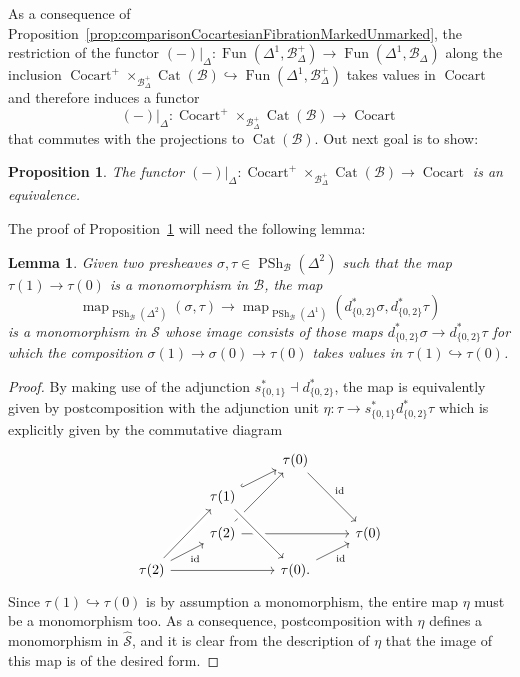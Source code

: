 \documentclass[reqno]{amsart}
\numberwithin{equation}{subsection}
\theoremstyle{plain}
\newtheorem{proposition}[equation]{Proposition}
\newtheorem{lemma}[equation]{Lemma}
\theoremstyle{definition}
\let\scr=\mathcal
\let\into=\hookrightarrow
\def\BB{\scr B}
\def\SS{\scr S}
\def\SSS{\widehat{\SS}}
\DeclareMathOperator{\id}{id}
\DeclareMathOperator{\PSh}{PSh}
\DeclareMathOperator{\Cat}{Cat}
\DeclareMathOperator{\Cocart}{Cocart}
\DeclareMathOperator{\Fun}{Fun}
\DeclareMathOperator{\Map}{map}
\newcommand{\map}[1]{\Map_{#1}}
\newcommand{\Simp}[1]{#1_{\Delta}}
\newcommand{\mSimp}[1]{#1_{\Delta}^+}
\begin{document}
As a consequence of Proposition~\ref{prop:comparisonCocartesianFibrationMarkedUnmarked}, the restriction of the functor $(-)\vert_{\Delta}\colon \Fun(\Delta^1,\mSimp\BB)\to\Fun(\Delta^1,\Simp\BB)$ along the inclusion $\Cocart^+\times_{\mSimp\BB}\Cat(\BB)\into\Fun(\Delta^1,\mSimp\BB)$ takes values in $\Cocart$ and therefore induces a functor
\begin{equation*}
(-)\vert_{\Delta}\colon \Cocart^+\times_{\mSimp\BB}\Cat(\BB)\to\Cocart
\end{equation*}
that commutes with the projections to $\Cat(\BB)$. Out next goal is to show:

\begin{proposition}
	\label{prop:cocartesianFibrationsMarkedUnmarkedEquivalence}
	The functor $(-)\vert_{\Delta}\colon \Cocart^+\times_{\mSimp\BB}\Cat(\BB)\to\Cocart$ is an equivalence.
\end{proposition}
The proof of Proposition~\ref{prop:cocartesianFibrationsMarkedUnmarkedEquivalence} will need the following lemma:
\begin{lemma}
	\label{lem:restrictionSimplicesMonomorphism}
	Given two presheaves $\sigma,\tau\in\PSh_{\BB}(\Delta^2)$ such that the map $\tau(1)\to\tau(0)$ is a monomorphism in $\BB$, the map
	\begin{equation*}
	\map{\PSh_{\BB}(\Delta^2)}(\sigma,\tau)\to\map{\PSh_{\BB}(\Delta^1)}(d_{\{0,2\}}^\ast\sigma, d_{\{0,2\}}^\ast\tau)
	\end{equation*}
	is a monomorphism in $\SS$ whose image consists of those maps $d_{\{0,2\}}^\ast\sigma\to d_{\{0,2\}}^\ast\tau$ for which the composition $\sigma(1)\to\sigma(0)\to\tau(0)$ takes values in $\tau(1)\into\tau(0)$.
\end{lemma}
\begin{proof}
	By making use of the adjunction $s_{\{0,1\}}^\ast\dashv d_{\{0,2\}}^\ast$, the map is equivalently given by postcomposition with the adjunction unit $\eta\colon \tau\to s_{\{0,1\}}^\ast d_{\{0,2\}}^\ast\tau$ which is explicitly given by the commutative diagram
	\begin{equation*}
	\begin{tikzcd}[row sep=small]
		& & \tau(0)\arrow[ddr, "\id"] & \\
		& \tau(1) \arrow[ur, hookrightarrow]& & \\
		& \tau(2) \arrow[rr]\arrow[uur]&& \tau(0)\\
		\tau(2) \arrow[ur, "\id"']\arrow[uur, crossing over]\arrow[rr]&& \tau(0). \arrow[ur, "\id"']\arrow[from=uul, crossing over]&
	\end{tikzcd}
	\end{equation*}
	Since $\tau(1)\into\tau(0)$ is by assumption a monomorphism, the entire map $\eta$ must be a monomorphism too. As a consequence, postcomposition with $\eta$ defines a monomorphism in $\SSS$, and it is clear from the description of $\eta$ that the image of this map is of the desired form.
\end{proof}
\end{document}

